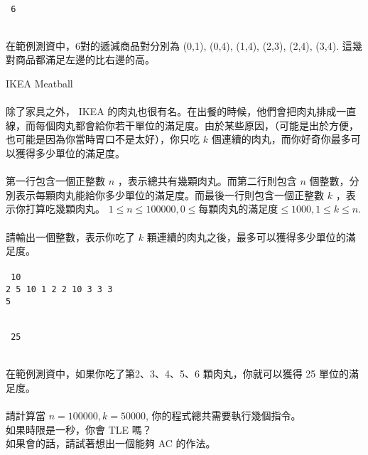 \documentclass{article}
\begin{document}
\\
    \texttt{
        6\\
    }

\\
    在範例測資中，6對的遞減商品對分別為 (0,1), (0,4), (1,4), (2,3), (2,4), (3,4). 這幾對商品都滿足左邊的比右邊的高。\\
\newpage

{\huge IKEA Meatball}\\

\\
    除了家具之外， IKEA 的肉丸也很有名。在出餐的時候，他們會把肉丸排成一直線，而每個肉丸都會給你若干單位的滿足度。由於某些原因，（可能是出於方便，也可能是因為你當時胃口不是太好），你只吃 $k$ 個連續的肉丸，而你好奇你最多可以獲得多少單位的滿足度。\\

\\
    第一行包含一個正整數 $n$ ，表示總共有幾顆肉丸。而第二行則包含 $n$ 個整數，分別表示每顆肉丸能給你多少單位的滿足度。而最後一行則包含一個正整數 $k$ ，表示你打算吃幾顆肉丸。
    $1\leq n\leq 100000, 0\leq \text{每顆肉丸的滿足度}\leq 1000, 1\leq k\leq n$.\\

\\
    請輸出一個整數，表示你吃了 $k$ 顆連續的肉丸之後，最多可以獲得多少單位的滿足度。\\

\\
    \texttt{
        10\\
        2 5 10 1 2 2 10 3 3 3\\
        5\\
    }


\\
    \texttt{
        25\\
    }

\\
    在範例測資中，如果你吃了第2、3、4、5、6 顆肉丸，你就可以獲得 25 單位的滿足度。\\

\\
    請計算當 \(n=100000, k=50000\), 你的程式總共需要執行幾個指令。\\
    如果時限是一秒，你會 TLE 嗎？\\
    如果會的話，請試著想出一個能夠 AC 的作法。\\
\newpage
\end{document}
